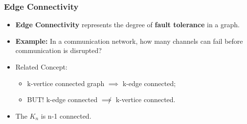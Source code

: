 \documentclass{beamer}
\begin{document}
\begin{frame}
  \frametitle{Edge Connectivity}

  {\large

    \begin{itemize}
      
    \item {\bf Edge Connectivity} represents the degree of
      {\bf fault tolerance} in a graph.

      
    \item {\bf Example:} In a communication network, how many
      channels can fail before communication is disrupted?

      \bigskip

    \item Related Concept: 

      \begin{itemize}
      \item k-vertice connected graph $\implies$ k-edge connected;
      \item \alert{BUT!} k-edge connected $\not\implies$ k-vertice
        connected.
      \end{itemize}

    \item The  $K_n$ is n-1 connected.      
    \end{itemize}
  }
  
\end{frame}
\end{document}
